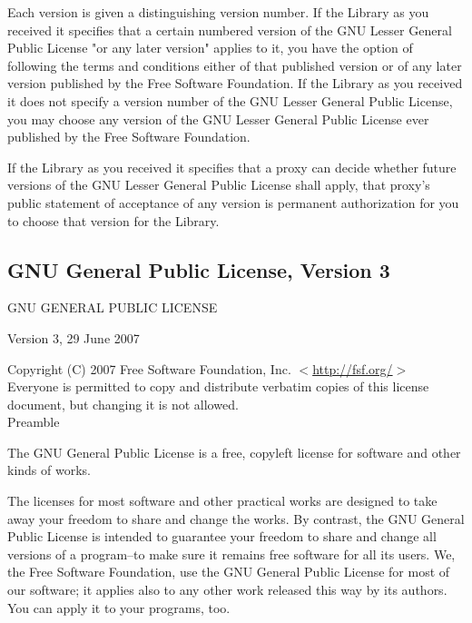 Each version is given a distinguishing version number. If the
Library as you received it specifies that a certain numbered version
of the GNU Lesser General Public License "or any later version"
applies to it, you have the option of following the terms and
conditions either of that published version or of any later version
published by the Free Software Foundation. If the Library as you
received it does not specify a version number of the GNU Lesser
General Public License, you may choose any version of the GNU Lesser
General Public License ever published by the Free Software Foundation.

If the Library as you received it specifies that a proxy can decide
whether future versions of the GNU Lesser General Public License shall
apply, that proxy's public statement of acceptance of any version is
permanent authorization for you to choose that version for the
Library.


\newpage 



\subsection{GNU General Public License, Version 3}
\label{GPLv3}
\begin{center}
	GNU GENERAL PUBLIC LICENSE
	
	Version 3, 29 June 2007
\end{center}

\noindent Copyright (C) 2007 Free Software Foundation, Inc.  $<$\href{http://fsf.org/}{http://fsf.org/}$>$ \\

\noindent Everyone is permitted to copy and distribute verbatim copies
of this license document, but changing it is not allowed. \\



Preamble

The GNU General Public License is a free, copyleft license for
software and other kinds of works.

The licenses for most software and other practical works are designed
to take away your freedom to share and change the works.  By contrast,
the GNU General Public License is intended to guarantee your freedom to
share and change all versions of a program--to make sure it remains free
software for all its users.  We, the Free Software Foundation, use the
GNU General Public License for most of our software; it applies also to
any other work released this way by its authors.  You can apply it to
your programs, too.

